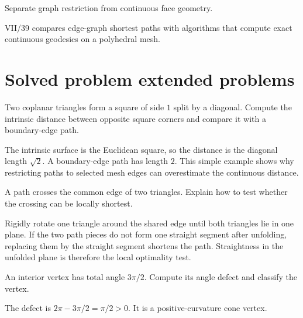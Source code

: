 \begin{hint}
Separate graph restriction from continuous face geometry.
\end{hint}

\begin{solution}
VII/39 compares edge-graph shortest paths with algorithms that compute exact continuous geodesics on a polyhedral mesh.
\end{solution}

\section{Solved problem extended problems}

\begin{problem}\label{prob:vii38-01}
Two coplanar triangles form a square of side \(1\) split by a diagonal.  Compute the intrinsic distance between opposite square corners and compare it with a boundary-edge path.
\end{problem}

\begin{solution}
The intrinsic surface is the Euclidean square, so the distance is the diagonal length \(\sqrt2\).  A boundary-edge path has length \(2\).  This simple example shows why restricting paths to selected mesh edges can overestimate the continuous distance.
\end{solution}

\begin{problem}\label{prob:vii38-02}
A path crosses the common edge of two triangles.  Explain how to test whether the crossing can be locally shortest.
\end{problem}

\begin{solution}
Rigidly rotate one triangle around the shared edge until both triangles lie in one plane.  If the two path pieces do not form one straight segment after unfolding, replacing them by the straight segment shortens the path.  Straightness in the unfolded plane is therefore the local optimality test.
\end{solution}

\begin{problem}\label{prob:vii38-03}
An interior vertex has total angle \(3\pi/2\).  Compute its angle defect and classify the vertex.
\end{problem}

\begin{solution}
The defect is \(2\pi-3\pi/2=\pi/2>0\).  It is a positive-curvature cone vertex.
\end{solution}


